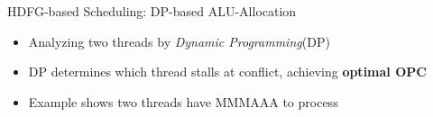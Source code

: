 \documentclass{beamer}
\begin{document}
\begin{CJK}{UTF8}{bkai}
            \begin{frame}{HDFG-based Scheduling: DP-based ALU-Allocation}
                \begin{itemize}
                    \pause
                    \item {Analyzing two threads by \textit{Dynamic Programming}\footnotemark (DP)}
                    \pause
                    \item {DP determines which thread stalls at conflict, achieving \textbf{optimal OPC}}
                    \pause
                    \item {Example shows two threads have MMMAAA to process}
                \end{itemize}
                    \setcounter{subfigure}{0}
                    \pause
                    \vspace{-1em}
                    \begin{figure}[!ht]
                        \begin{center}
                            \hfill
                            \hfill
\end{center}
\end{figure}
\end{frame}
\end{CJK}
\end{document}
